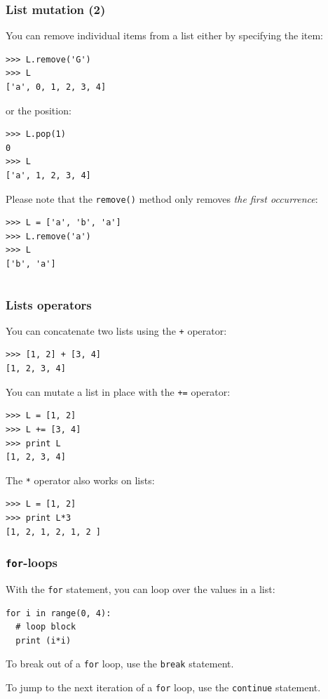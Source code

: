 \documentclass[english,serif,mathserif,xcolor=pdftex,dvipsnames,table]{beamer}
\begin{document}
\begin{frame}[fragile]
  \frametitle{List mutation (2)}
  You can remove individual items from a list either by specifying
  the item:
\begin{lstlisting}
>>> L.remove('G')
>>> L
['a', 0, 1, 2, 3, 4]
\end{lstlisting}

\pause
or the position:

\begin{lstlisting}
>>> L.pop(1)
0
>>> L
['a', 1, 2, 3, 4]
\end{lstlisting}

\pause
Please note that the \texttt{remove()} method only removes
\textit{the first occurrence}:

\begin{lstlisting}
>>> L = ['a', 'b', 'a']
>>> L.remove('a')
>>> L
['b', 'a']
\end{lstlisting}
\begin{lstlisting}

\end{lstlisting}
\end{frame}


\begin{frame}[fragile]
  \frametitle{Lists operators}
  You can concatenate two lists using the \texttt{+} operator:
  \begin{lstlisting}
>>> [1, 2] + [3, 4]
[1, 2, 3, 4]
  \end{lstlisting}

  \+
  You can mutate a list in place with the \texttt{+=} operator:
  \begin{lstlisting}
>>> L = [1, 2]
>>> L += [3, 4]
>>> print L
[1, 2, 3, 4]    
  \end{lstlisting}

\+
The \texttt{*} operator also works on lists:
  \begin{lstlisting}
>>> L = [1, 2]
>>> print L*3
[1, 2, 1, 2, 1, 2 ]
  \end{lstlisting}
\end{frame}


\begin{frame}[fragile]
  \frametitle{\texttt{for}-loops}
    With the  \texttt{for} statement, you can loop over the values in
    a list:
\begin{lstlisting}
for i in range(0, 4):
  # loop block
  print (i*i)
\end{lstlisting}

  \+
  To break out of a \texttt{for} loop, use the \texttt{break}
  statement.

  \+
  To jump to the next iteration of a \texttt{for} loop, use the
  \texttt{continue} statement.
\end{frame}
\end{document}
